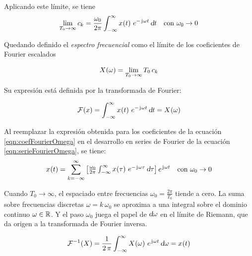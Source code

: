 Aplicando este límite, se tiene
\begin{equation}
    \lim_{T_0 \to \infty} c_\kth =
    \frac{\omega_0}{2 \pi}
    \int_{-\infty}^\infty \fx[x]{t} \, e^{- \iu \omega t}
    \, \dif t
    \quad \text{con } \omega_0 \to 0
    \label{eqn:coefFourierOmega}
\end{equation}

Quedando definido el \emph{espectro frecuencial} como el límite de los coeficientes de Fourier escalados

\begin{mdframed}[style=DefinitionFrame]
    \begin{defn}
    \end{defn}
    \[
        \fx[X]{\omega} = \lim_{T_0 \to \infty} T_0 \, c_k
    \]
\end{mdframed}

Su expresión está definida por la transformada de Fourier:

\begin{mdframed}[style=DefinitionFrame]
    \begin{defn}
        \label{defn:FourierTrans}
    \end{defn}
    \[
        \fourier{x}
        = \int_{-\infty}^\infty \fx[x]{t} \, e^{- \iu \omega t} \, \dif t
        = \fx[X]{\omega}
    \]
\end{mdframed}

Al reemplazar la expresión obtenida para los coeficientes de la ecuación \ref{eqn:coefFourierOmega} en el desarrollo en series de Fourier de la ecuación \ref{eqn:serieFourierOmega}, se tiene:
\[
    \fx[x]{t}
    = \sum_{\kth=-\infty}^\infty
    \inBrackets{ \frac{\omega_0}{2 \pi} \int_{-\infty}^{\infty} \fx[x]{\tau} \, e^{- \iu \omega \tau} \, \dif \tau }
    \, \complexExp
    \quad \text{con } \omega_0 \to 0
\]

Cuando $T_0 \to \infty$, el espaciado entre frecuencias $\omega_0 = \frac{2\pi}{T_0}$ tiende a cero.
La suma sobre frecuencias discretas $\omega = k \, \omega_0$ se aproxima a una integral sobre el dominio continuo $\omega \in \setR$.
Y el paso $\omega_0$ juega el papel de $\dif \omega$ en el límite de Riemann, que da origen a la transformada de Fourier inversa.

\begin{mdframed}[style=DefinitionFrame]
    \begin{defn}
        \label{defn:FourierTransInv}
    \end{defn}
    \[
        \ffourier{X}
        = \frac{1}{2 \, \pi} \int_{-\infty}^\infty \fx[X]{\omega} \, \complexExp \, \dif \omega
        = \fx[x]{t}
    \]
\end{mdframed}
